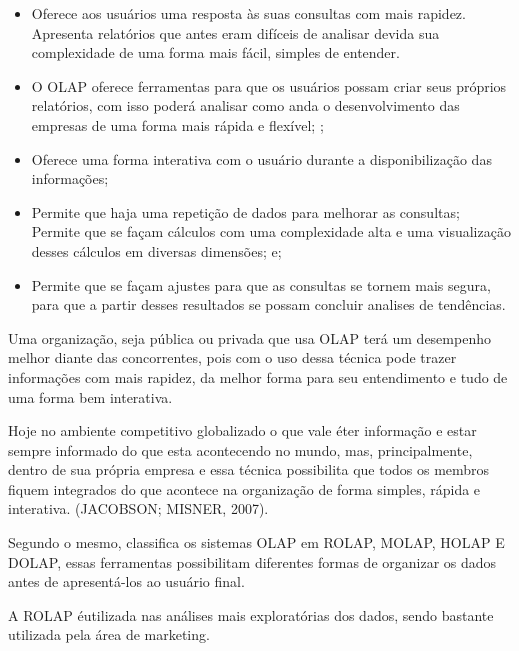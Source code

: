\begin{itemize}
    
    \item Oferece aos usu\'{a}rios uma resposta \`{a}s suas consultas com mais rapidez. Apresenta relat\'{o}rios que antes eram dif\'{i}ceis de analisar devida sua complexidade de uma forma mais f\'{a}cil, simples de entender.
    
    \item O OLAP oferece ferramentas para que os usu\'{a}rios possam criar seus pr\'{o}prios relat\'{o}rios, com isso poder\'{a} analisar como anda o desenvolvimento das empresas de uma forma mais r\'{a}pida e flex\'{i}vel; \cite{bi-larson-2006};
    
    \item Oferece uma forma interativa com o usu\'{a}rio durante a disponibiliza\c{c}\~{a}o das informa\c{c}\~{o}es;
    
    \item Permite que haja uma repeti\c{c}\~{a}o de dados para melhorar as consultas;
    Permite que se fa\c{c}am c\'{a}lculos com uma complexidade alta e uma visualiza\c{c}\~{a}o desses c\'{a}lculos em diversas dimens\~{o}es; e;
    
    \item Permite que se fa\c{c}am ajustes para que as consultas se tornem mais segura, para que a partir desses resultados se possam concluir analises de tendências.

\end{itemize}

Uma organiza\c{c}\~{a}o, seja pública ou privada que usa OLAP ter\'{a} um desempenho melhor diante das concorrentes, pois com o uso dessa t\'{e}cnica pode trazer informa\c{c}\~{o}es com mais rapidez, da melhor forma para seu entendimento e tudo de uma forma bem interativa. 

Hoje no ambiente competitivo globalizado o que vale \'{e}ter informa\c{c}\~{a}o e estar sempre informado do que esta acontecendo no mundo, mas, principalmente, dentro de sua pr\'{o}pria empresa e essa t\'{e}cnica possibilita que todos os membros fiquem integrados do que acontece na organiza\c{c}\~{a}o de forma simples, r\'{a}pida e interativa. (JACOBSON; MISNER, 2007).

Segundo \cite{dw-kimball-2013} o mesmo, classifica os sistemas OLAP em ROLAP, MOLAP, HOLAP E DOLAP, essas ferramentas possibilitam diferentes formas de organizar os dados antes de apresent\'{a}-los ao usu\'{a}rio final.

A ROLAP \'{e}utilizada nas an\'{a}lises mais explorat\'{o}rias dos dados, sendo bastante utilizada pela \'{a}rea de marketing. 

